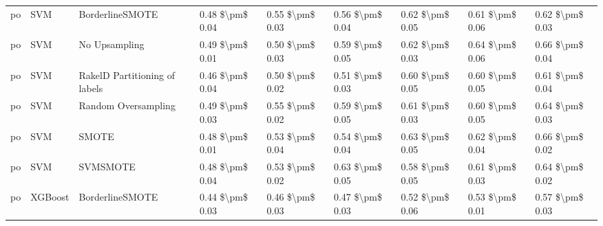 \begin{tabular}{lllllllll}
      po &                             SVM &               BorderlineSMOTE & 0.48 \$\textbackslash pm\$ 0.04 &           0.55 \$\textbackslash pm\$ 0.03 &       0.56 \$\textbackslash pm\$ 0.04 &        0.62 \$\textbackslash pm\$ 0.05 &                         0.61 \$\textbackslash pm\$ 0.06 &     0.62 \$\textbackslash pm\$ 0.03 \\
      po &                             SVM &                 No Upsampling & 0.49 \$\textbackslash pm\$ 0.01 &           0.50 \$\textbackslash pm\$ 0.03 &       0.59 \$\textbackslash pm\$ 0.05 &        0.62 \$\textbackslash pm\$ 0.03 &                         0.64 \$\textbackslash pm\$ 0.06 &     0.66 \$\textbackslash pm\$ 0.04 \\
      po &                             SVM & RakelD Partitioning of labels & 0.46 \$\textbackslash pm\$ 0.04 &           0.50 \$\textbackslash pm\$ 0.02 &       0.51 \$\textbackslash pm\$ 0.03 &        0.60 \$\textbackslash pm\$ 0.05 &                         0.60 \$\textbackslash pm\$ 0.05 &     0.61 \$\textbackslash pm\$ 0.04 \\
      po &                             SVM &           Random Oversampling & 0.49 \$\textbackslash pm\$ 0.03 &           0.55 \$\textbackslash pm\$ 0.02 &       0.59 \$\textbackslash pm\$ 0.05 &        0.61 \$\textbackslash pm\$ 0.03 &                         0.60 \$\textbackslash pm\$ 0.05 &     0.64 \$\textbackslash pm\$ 0.03 \\
      po &                             SVM &                         SMOTE & 0.48 \$\textbackslash pm\$ 0.01 &           0.53 \$\textbackslash pm\$ 0.04 &       0.54 \$\textbackslash pm\$ 0.04 &        0.63 \$\textbackslash pm\$ 0.05 &                         0.62 \$\textbackslash pm\$ 0.04 &     0.66 \$\textbackslash pm\$ 0.02 \\
      po &                             SVM &                      SVMSMOTE & 0.48 \$\textbackslash pm\$ 0.04 &           0.53 \$\textbackslash pm\$ 0.02 &       0.63 \$\textbackslash pm\$ 0.05 &        0.58 \$\textbackslash pm\$ 0.05 &                         0.61 \$\textbackslash pm\$ 0.03 &     0.64 \$\textbackslash pm\$ 0.02 \\
      po &                         XGBoost &               BorderlineSMOTE & 0.44 \$\textbackslash pm\$ 0.03 &           0.46 \$\textbackslash pm\$ 0.03 &       0.47 \$\textbackslash pm\$ 0.03 &        0.52 \$\textbackslash pm\$ 0.06 &                         0.53 \$\textbackslash pm\$ 0.01 &     0.57 \$\textbackslash pm\$ 0.03 \\

\end{tabular}
